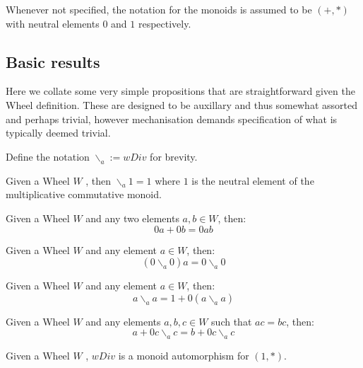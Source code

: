 Whenever not specified, the notation for the monoids is assumed to be $(+,*)$ with neutral elements $0$ and $1$ respectively.
\subsection{Basic results}
Here we collate some very simple propositions that are straightforward given the Wheel definition. These are designed to be auxillary 
and thus somewhat assorted and perhaps trivial, however mechanisation demands specification of what is typically deemed trivial.\par
Define the notation $\backslash_{a}  := wDiv $ for brevity.
\begin{proposition}
\label{prop:wDiv_one}
\leanok
Given a Wheel $W$ , then $\backslash_{a} 1 = 1$  where $1$ is the neutral element of the multiplicative commutative monoid.
\end{proposition}
\begin{proposition}
\label{prop:zero_mul_add}
\leanok
Given a Wheel $W$ and any two elements $a,b \in W$, then:
\[
0a + 0b = 0ab
\]
\end{proposition}
\begin{proposition}
\label{prop:zero_wdiv_mul}
\leanok
Given a Wheel $W$ and any element $a \in W$, then:
\[
(0 \backslash_{a}  0)a = 0 \backslash_{a}  0
\]
\end{proposition}
\begin{proposition}
\label{prop:wdiv_selfl}
\leanok
Given a Wheel $W$ and any element $a \in W$, then:
\[
a\backslash_{a}  a = 1 + 0(a\backslash_{a}  a)
\]
\end{proposition}
\begin{proposition}
\label{prop:wdiv_right_cancell}
\leanok
Given a Wheel $W$ and any elements $a,b,c \in W$ such that $ac = bc$, then:
\[
a + 0c\backslash_{a} c = b + 0c\backslash_{a} c
\]
\end{proposition}
\begin{proposition}
\label{prop:wDivMonAuto}
\leanok
Given a Wheel $W$ ,  $wDiv$ is a monoid automorphism for $(1,*)$.
\end{proposition}
